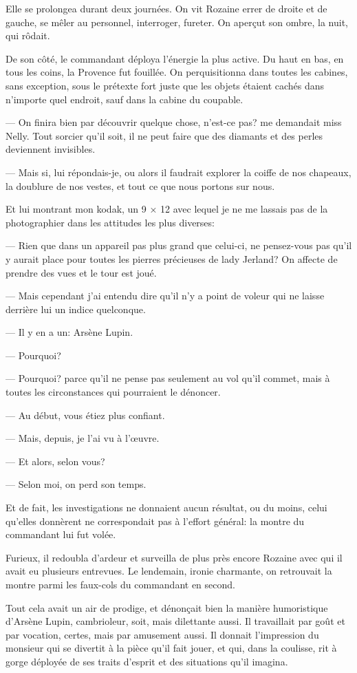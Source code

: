 \documentclass[12pt,a4paper]{article}
\begin{document}
Elle se prolongea durant deux journées. On vit Rozaine errer de droite et de gauche, se mêler au personnel, interroger, fureter. On aperçut son ombre, la nuit, qui rôdait.

De son côté, le commandant déploya l’énergie la plus active. Du haut en bas, en tous les coins, la Provence fut fouillée. On perquisitionna dans toutes les cabines, sans exception, sous le prétexte fort juste que les objets étaient cachés dans n’importe quel endroit, sauf dans la cabine du coupable.

— On finira bien par découvrir quelque chose, n’est-ce pas? me demandait miss Nelly. Tout sorcier qu’il soit, il ne peut faire que des diamants et des perles deviennent invisibles.

— Mais si, lui répondais-je, ou alors il faudrait explorer la coiffe de nos chapeaux, la doublure de nos vestes, et tout ce que nous portons sur nous.

Et lui montrant mon kodak, un 9 × 12 avec lequel je ne me lassais pas de la photographier dans les attitudes les plus diverses:

— Rien que dans un appareil pas plus grand que celui-ci, ne pensez-vous pas qu’il y aurait place pour toutes les pierres précieuses de lady Jerland? On affecte de prendre des vues et le tour est joué.

— Mais cependant j’ai entendu dire qu’il n’y a point de voleur qui ne laisse derrière lui un indice quelconque.

— Il y en a un: Arsène Lupin.

— Pourquoi?

— Pourquoi? parce qu’il ne pense pas seulement au vol qu’il commet, mais à toutes les circonstances qui pourraient le dénoncer.

— Au début, vous étiez plus confiant.

— Mais, depuis, je l’ai vu à l’œuvre.

— Et alors, selon vous?

— Selon moi, on perd son temps.

Et de fait, les investigations ne donnaient aucun résultat, ou du moins, celui qu’elles donnèrent ne correspondait pas à l’effort général: la montre du commandant lui fut volée.

Furieux, il redoubla d’ardeur et surveilla de plus près encore Rozaine avec qui il avait eu plusieurs entrevues. Le lendemain, ironie charmante, on retrouvait la montre parmi les faux-cols du commandant en second.

Tout cela avait un air de prodige, et dénonçait bien la manière humoristique d’Arsène Lupin, cambrioleur, soit, mais dilettante aussi. Il travaillait par goût et par vocation, certes, mais par amusement aussi. Il donnait l’impression du monsieur qui se divertit à la pièce qu’il fait jouer, et qui, dans la coulisse, rit à gorge déployée de ses traits d’esprit et des situations qu’il imagina.
\end{document}
